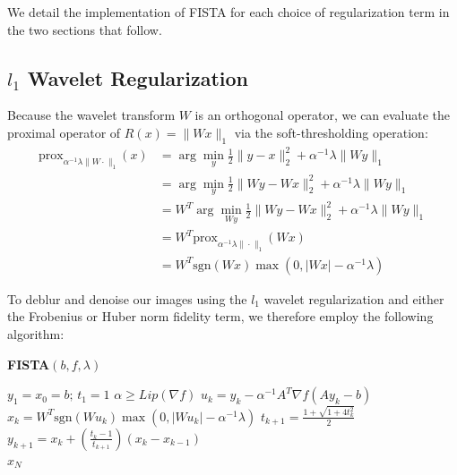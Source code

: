\documentclass[10pt,a4paper]{article}
\newcommand{\prox}{\mathrm{prox}}
\begin{document}
	We detail the implementation of FISTA for each choice of regularization term in the two sections that follow.
	
	\subsection{$l_1$ Wavelet Regularization}
	
	Because the wavelet transform $W$ is an orthogonal operator, we can evaluate the proximal operator of $R(x) = \|Wx\|_1$ via the soft-thresholding operation:
	\begin{equation}
	\begin{aligned}
	\prox_{\alpha^{-1}\lambda \| W \cdot \|_1}(x) &= \arg\min_y \frac{1}{2} \| y-x \|_2^2 + \alpha^{-1}\lambda \| Wy \|_1 \\
	&= \arg\min_y \frac{1}{2} \| Wy - Wx \|_2^2 + \alpha^{-1}\lambda \|Wy \|_1 \\
	&= W^T \arg\min_{Wy} \frac{1}{2} \| Wy - Wx \|_2^2 + \alpha^{-1}\lambda \|Wy \|_1 \\
	&= W^T \prox_{\alpha^{-1}\lambda \|\cdot\|_1}(Wx) \\
	&= W^T \text{sgn}(Wx) \max(0, |Wx|-\alpha^{-1}\lambda)
	\end{aligned}
	\end{equation}
	
	To deblur and denoise our images using the $l_1$ wavelet regularization and either the Frobenius or Huber norm fidelity term, we therefore employ the following algorithm:
	
	\begin{center}
		\begin{minipage}[T]{0.5\textwidth}
			\begin{framed}
				\textbf{FISTA$(b,f,\lambda)$}
				\begin{algorithmic}
					\State $y_1 = x_0 = b; \, t_1 = 1$
					\State $\alpha \geq Lip(\nabla f)$
					\State $u_k = y_k - \alpha^{-1} A^T \nabla f(Ay_k-b)$ \vspace{1ex}
					\State $x_k = W^T\text{sgn}(Wu_k)\max(0,|Wu_k|-\alpha^{-1}\lambda)$ \vspace{1ex}
					\State $t_{k+1} = \frac{1+\sqrt{1+4t_k^2}}{2}$
					\State $y_{k+1} = x_k + \left(\frac{t_k-1}{t_{k+1}}\right) (x_k - x_{k-1})$
					\EndFor\\
					\Return $x_N$
				\end{algorithmic}
			\end{framed}
		\end{minipage}
	\end{center}
	
\end{document}
